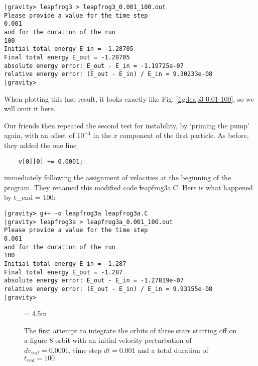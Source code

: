 \begin{small}
\begin{verbatim}
|gravity> leapfrog3 > leapfrog3_0.001_100.out
Please provide a value for the time step
0.001
and for the duration of the run
100
Initial total energy E_in = -1.28705
Final total energy E_out = -1.28705
absolute energy error: E_out - E_in = -1.19725e-07
relative energy error: (E_out - E_in) / E_in = 9.30233e-08
|gravity>
\end{verbatim}
\end{small}

When plotting this last result, it looks exactly like
Fig. \ref{fig:leap3-0.01-100}, so we will omit it here.

Our friends then repeated the second test for instability, by `priming
the pump' again, with an offset of $10^{-4}$ in the $x$ component of
the first particle.  As before, they added the one line

\begin{small}
\begin{verbatim}
    v[0][0] += 0.0001;
\end{verbatim}
\end{small}

\noindent
immediately following the assignment of velocities at the beginning of
the program.  They renamed this modified code {\st leapfrog3a.C}.
Here is what happened by {\st t\_end = 100}:

\begin{small}
\begin{verbatim}
|gravity> g++ -o leapfrog3a leapfrog3a.C
|gravity> leapfrog3a > leapfrog3a_0.001_100.out
Please provide a value for the time step
0.001
and for the duration of the run
100
Initial total energy E_in = -1.287
Final total energy E_out = -1.287
absolute energy error: E_out - E_in = -1.27819e-07
relative energy error: (E_out - E_in) / E_in = 9.93155e-08
|gravity>
\end{verbatim}
\end{small}

\begin{figure}[htb]
\begin{center}
\epsfxsize = 4.5in
\caption[Three stars on a figure-8 orbit, $dv_{init}=0.0001$, $dt = 0.001$,
$t_{end} = 100$]
{The first attempt to integrate the orbits of three stars starting off
on a figure-8 orbit with an initial velocity perturbation of
$dv_{init}=0.0001$, time step $dt = 0.001$ and a total duration of
$t_{end} = 100$}
\label{fig:leap3a-0.001-100}
\end{center}
\end{figure}

